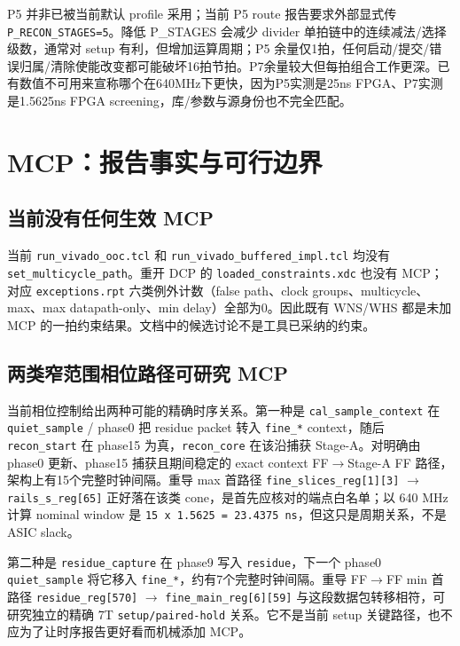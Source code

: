 \documentclass[UTF8,fontset=fandol,10pt,a4paper,openany]{ctexrep}
\newcommand{\code}[1]{\nolinkurl{#1}}
\begin{document}
P5 并非已被当前默认 profile 采用；当前 P5 route 报告要求外部显式传 \code{P_RECON_STAGES=5}。降低 P\_STAGES 会减少 divider 单拍链中的连续减法/选择级数，通常对 setup 有利，但增加运算周期；P5 余量仅1拍，任何启动/提交/错误归属/清除使能改变都可能破坏16拍节拍。P7余量较大但每拍组合工作更深。已有数值不可用来宣称哪个在640MHz下更快，因为P5实测是25ns FPGA、P7实测是1.5625ns FPGA screening，库/参数与源身份也不完全匹配。


\section{MCP：报告事实与可行边界}


\subsection{当前没有任何生效 MCP}


当前 \code{run_vivado_ooc.tcl} 和 \code{run_vivado_buffered_impl.tcl} 均没有 \code{set_multicycle_path}。重开 DCP 的 \code{loaded_constraints.xdc} 也没有 MCP；对应 \code{exceptions.rpt} 六类例外计数（false path、clock groups、multicycle、max、max datapath-only、min delay）全部为0。因此既有 WNS/WHS 都是未加 MCP 的一拍约束结果。文档中的候选讨论不是工具已采纳的约束。


\subsection{两类窄范围相位路径可研究 MCP}


当前相位控制给出两种可能的精确时序关系。第一种是 \code{cal_sample_context} 在 \code{quiet_sample} / phase0 把 residue packet 转入 \code{fine_*} context，随后 \code{recon_start} 在 phase15 为真，\code{recon_core} 在该沿捕获 Stage-A。对明确由 phase0 更新、phase15 捕获且期间稳定的 exact context FF\ensuremath{\rightarrow}Stage-A FF 路径，架构上有15个完整时钟间隔。重导 max 首路径 \code{fine_slices_reg[1][3]} \ensuremath{\rightarrow} \code{rails_s_reg[65]} 正好落在该类 cone，是首先应核对的端点白名单；以 640 MHz 计算 nominal window 是 \code{15 x 1.5625 = 23.4375 ns}，但这只是周期关系，不是 ASIC slack。


第二种是 \code{residue_capture} 在 phase9 写入 \code{residue}，下一个 phase0 \code{quiet_sample} 将它移入 \code{fine_*}，约有7个完整时钟间隔。重导 FF\ensuremath{\rightarrow}FF min 首路径 \code{residue_reg[570]} \ensuremath{\rightarrow} \code{fine_main_reg[6][59]} 与这段数据包转移相符，可研究独立的精确 7T \code{setup/paired-hold} 关系。它不是当前 setup 关键路径，也不应为了让时序报告更好看而机械添加 MCP。
\end{document}
